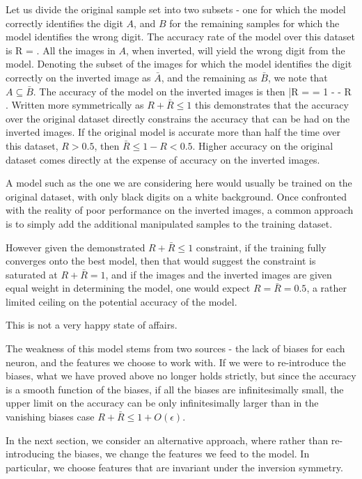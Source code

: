 \documentclass[twocolumn, prl]{revtex4-1}
\begin{document}
Let us divide the original sample set into two subsets - one for which the model correctly identifies the digit $A$, and $B$ for the remaining samples for which the model identifies the wrong digit. The accuracy rate of the model over this dataset is 
\be
R = 
\; .
\ee
All the images in $A$, when inverted, will yield the wrong digit from the model. Denoting the subset of the images for which the model identifies the digit correctly on the inverted image as ${\bar A}$, and the remaining as ${\bar B}$, we note that $A \subseteq {\bar B}$. The accuracy of the model on the inverted images is then
\be
{\bar R} =  = 1 -   - R
\; .
\ee
Written more symmetrically as $R + {\bar R} \leq 1$ this demonstrates that the accuracy over the original dataset directly constrains the accuracy that can be had on the inverted images. If the original model is accurate more than half the time over this dataset, $R>0.5$, then ${\bar R} \leq 1 - R < 0.5$. Higher accuracy on the original dataset comes directly at the expense of accuracy on the inverted images.

A model such as the one we are considering here would usually be trained on the original dataset, with only black digits on a white background. Once confronted with the reality of poor performance on the inverted images, a common approach is to simply add the additional manipulated samples to the training dataset.

However given the demonstrated $R + {\bar R} \leq 1$ constraint, if the training fully converges onto the best model, then that would suggest 
the constraint is saturated at $R + {\bar R} = 1$, and if the images and the inverted images are given equal weight in determining the model, one would expect $R = {\bar R} = 0.5$, a rather limited ceiling on the potential accuracy of the model.

This is not a very happy state of affairs. 

The weakness of this model stems from two sources - the lack of biases for each neuron, and the features we choose to work with. If we were to re-introduce the biases, what we have proved above no longer holds strictly, but since the accuracy is a smooth function of the biases, if all the biases are infinitesimally small, the upper limit on the accuracy can be only infinitesimally larger than in the vanishing biases case $R + {\bar R} \leq 1 + O(\epsilon)$.

In the next section, we consider an alternative approach, where rather than re-introducing the biases, we change the features we feed to the model. In particular, we choose features that are invariant under the inversion symmetry.
\end{document}
